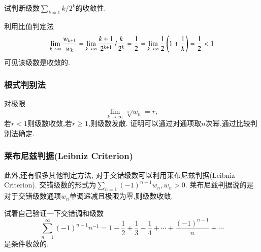 \begin{example}
试判断级数$\sum_{k=1} k/2^k$的收敛性.
\end{example}
\begin{solution}
    利用比值判定法
    \[ 
        \lim_{k\to \infty} \frac{w_{k+1}}{w_k}=\lim_{k\to \infty} \frac{k+1}{2^{k+1}} / \frac{k}{2^{k}}=\frac{1}{2} 
        = \lim_{k\to \infty} \frac{1}{2}\left(1+\frac{1}{k}\right) 
        = {\frac{1}{2}} < 1
    \]
    可见该级数是收敛的.
\end{solution}

\subsubsection{根式判别法}
对极限
$$
\lim_{k\to \infty} \sqrt[n]{w_n} = r,
$$
若$r<1$则级数收敛,若$r\geq 1$,则级数发散. 证明可以通过对通项取$n$次幂,通过比较判别法确定.



\subsubsection{莱布尼兹判据(Leibniz Criterion)}
此外,还有很多其他判定方法, 对于交错级数可以利用莱布尼兹判据(Leibniz Criterion).
交错级数的形式为$\sum_{n=1} (-1)^{n+1} w_n, w_n >0$. 莱布尼兹判据说的是对于交错级数通项$w_n$单调递减且极限为零,则级数收敛.

试着自己验证一下交错调和级数
\begin{equation}
    \sum_{n=1}^{\infty}(-1)^{n-1} n^{-1}=1-\frac{1}{2}+\frac{1}{3}-\frac{1}{4}+\cdots+\frac{(-1)^{n-1}}{n}+\cdots
\end{equation}
是条件收敛的.

